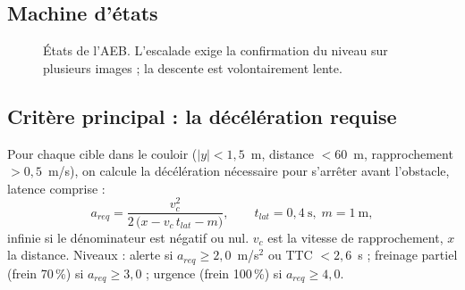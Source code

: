 \documentclass[11pt,a4paper]{article}
\begin{document}
\subsection{Machine d'\'etats}
\begin{figure}[H]
\centering
{}
\caption{\'Etats de l'AEB. L'escalade exige la confirmation du niveau sur plusieurs images ; la descente est volontairement lente.}
\end{figure}

\subsection{Crit\`ere principal : la d\'ec\'el\'eration requise}
Pour chaque cible dans le couloir ($|y|<1{,}5$~m, distance $<60$~m, rapprochement $>0{,}5$~m/s), on calcule la d\'ec\'el\'eration n\'ecessaire pour
s'arr\^eter avant l'obstacle, latence comprise :
\[
 a_{req}=\frac{v_c^{2}}{2\,\bigl(x-v_c\,t_{lat}-m\bigr)},\qquad t_{lat}=0{,}4~\text{s},\; m=1~\text{m},
\]
infinie si le d\'enominateur est n\'egatif ou nul. $v_c$ est la vitesse de rapprochement, $x$ la distance. Niveaux : alerte si $a_{req}\ge 2{,}0$~m/s$^2$ ou
TTC $<2{,}6$~s ; freinage partiel (frein 70\,\%) si $a_{req}\ge 3{,}0$ ; urgence (frein 100\,\%) si $a_{req}\ge 4{,}0$.
\end{document}
